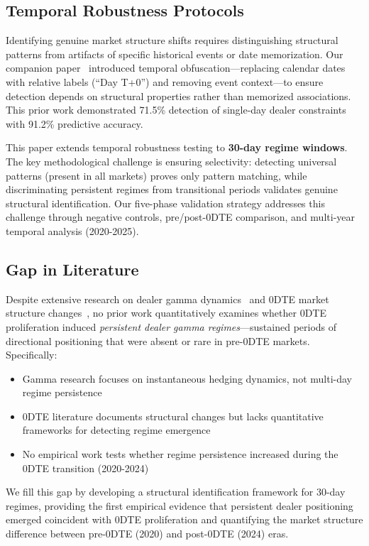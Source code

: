 \subsection{Temporal Robustness Protocols}

Identifying genuine market structure shifts requires distinguishing structural patterns from artifacts of specific historical events or date memorization. Our companion paper~\citep{regan2025obfuscation} introduced temporal obfuscation---replacing calendar dates with relative labels (``Day T+0'') and removing event context---to ensure detection depends on structural properties rather than memorized associations. This prior work demonstrated 71.5\% detection of single-day dealer constraints with 91.2\% predictive accuracy.

This paper extends temporal robustness testing to \textbf{30-day regime windows}. The key methodological challenge is ensuring selectivity: detecting universal patterns (present in all markets) proves only pattern matching, while discriminating persistent regimes from transitional periods validates genuine structural identification. Our five-phase validation strategy addresses this challenge through negative controls, pre/post-0DTE comparison, and multi-year temporal analysis (2020-2025).

\subsection{Gap in Literature}

Despite extensive research on dealer gamma dynamics~\citep{ni2005stock,baltussen2021hedging} and 0DTE market structure changes~\citep{dim2025zero}, no prior work quantitatively examines whether 0DTE proliferation induced \textit{persistent dealer gamma regimes}---sustained periods of directional positioning that were absent or rare in pre-0DTE markets. Specifically:

\begin{itemize}
\item Gamma research focuses on instantaneous hedging dynamics, not multi-day regime persistence
\item 0DTE literature documents structural changes but lacks quantitative frameworks for detecting regime emergence
\item No empirical work tests whether regime persistence increased during the 0DTE transition (2020-2024)
\end{itemize}

We fill this gap by developing a structural identification framework for 30-day regimes, providing the first empirical evidence that persistent dealer positioning emerged coincident with 0DTE proliferation and quantifying the market structure difference between pre-0DTE (2020) and post-0DTE (2024) eras.

